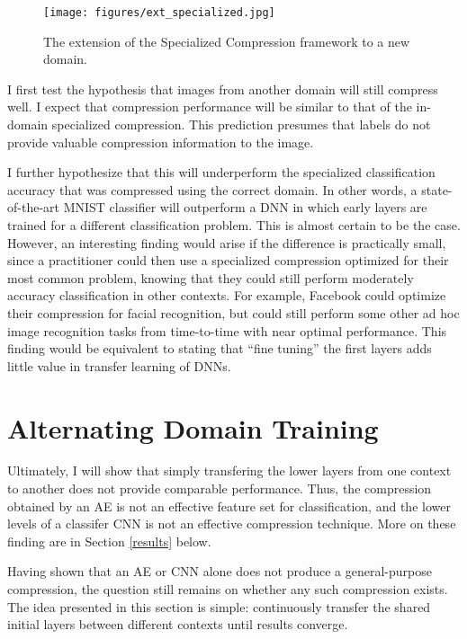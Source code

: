 \documentclass[twoside,11pt]{article}
\begin{document}
\begin{figure}
  \texttt{[image: figures/ext\_specialized.jpg]}
  \caption{The extension of the Specialized Compression framework to a new domain.}
  \label{fig:ext_specialized}
\end{figure}

I first test the hypothesis that images from another domain will still compress well. 
I expect that compression performance will be similar to that of the in-domain 
specialized compression. This prediction presumes that labels do not provide 
valuable compression information to the image.

I further hypothesize that this will underperform the specialized classification 
accuracy that was compressed using the correct domain. 
In other words, a state-of-the-art MNIST classifier will outperform a DNN in which 
early layers are trained for a different classification problem. 
This is almost certain to be the case. However, an interesting finding would arise 
if the difference is practically small, since a practitioner could then use 
a specialized compression optimized for their most common problem, knowing that 
they could still perform moderately accuracy classification in other contexts. 
For example, Facebook could optimize their compression for facial recognition, 
but could still perform some other ad hoc image recognition tasks from 
time-to-time with near optimal performance. This finding would be equivalent 
to stating that “fine tuning” the first layers adds little value in transfer learning of DNNs.







\section{Alternating Domain Training}

Ultimately, I will show that simply transfering the lower layers from one context to another 
does not provide comparable performance. Thus, the compression obtained by an AE
is not an effective feature set for classification, and the lower levels of a classifer 
CNN is not an effective compression technique. More on these finding are in 
Section \ref{results} below.

Having shown that an AE or CNN alone does not produce a general-purpose compression,
the question still remains on whether any such compression exists. 
The idea presented in this section is simple: continuously transfer the shared
initial layers between different contexts until results converge. 
\end{document}
